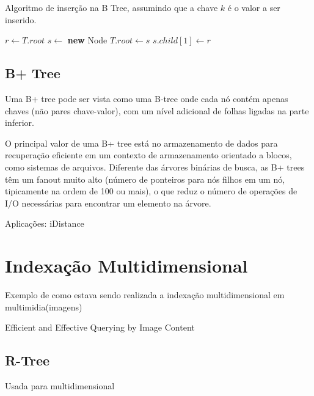 \begin{algorithm}
\caption{Algoritmo de inserção na B Tree, assumindo que a chave $k$ é o valor a ser inserido.}
\label{alg:btree_insertion}
\begin{algorithmic}[1]
    \State $r \gets T.root$
        \State $s \gets$ \textbf{new} Node
        \State $T.root \gets s$
        \State $s.child[1] \gets r$
        \State {}
        \State {}
    \Else
        \State {}
    \EndIf
\EndProcedure
\end{algorithmic}
\end{algorithm}

\cite{btree:wiki,btree:comer1979,btree:bayer1970}

\subsection{B+ Tree}

Uma B+ tree pode ser vista como uma B-tree onde cada nó contém apenas chaves (não pares chave-valor), com um nível adicional de folhas ligadas na parte inferior.

O principal valor de uma B+ tree está no armazenamento de dados para recuperação eficiente em um contexto de armazenamento orientado a blocos, como sistemas de arquivos. Diferente das árvores binárias de busca, as B+ trees têm um fanout muito alto (número de ponteiros para nós filhos em um nó, tipicamente na ordem de 100 ou mais), o que reduz o número de operações de I/O necessárias para encontrar um elemento na árvore.

Aplicações: iDistance

\cite{bptree:wiki}

\section{Indexação Multidimensional}
\label{sec:multidimsearch}

Exemplo de como estava sendo realizada a indexação multidimensional em multimidia(imagens)

Efficient and Effective Querying by Image Content

\subsection{R-Tree}

Usada para multidimensional

